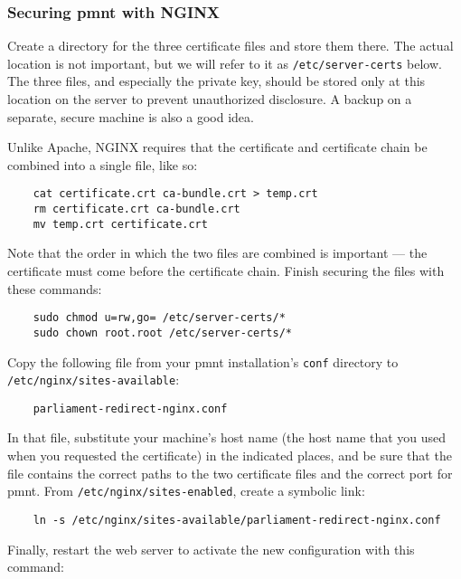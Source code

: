 \subsubsection{Securing \ac{pmnt} with NGINX}
\label{section-securing-parliament-nginx}

Create a directory for the three certificate files and store them there.  The actual location is not important, but we will refer to it as \texttt{/etc/server-certs} below.  The three files, and especially the private key, should be stored only at this location on the server to prevent unauthorized disclosure.  A backup on a separate, secure machine is also a good idea.

Unlike Apache, NGINX requires that the certificate and certificate chain be combined into a single file, like so:

\begin{Verbatim}
	cat certificate.crt ca-bundle.crt > temp.crt
	rm certificate.crt ca-bundle.crt
	mv temp.crt certificate.crt
\end{Verbatim}

Note that the order in which the two files are combined is important --- the certificate must come before the certificate chain.  Finish securing the files with these commands:

\begin{Verbatim}
	sudo chmod u=rw,go= /etc/server-certs/*
	sudo chown root.root /etc/server-certs/*
\end{Verbatim}

Copy the following file from your \ac{pmnt} installation's \texttt{conf} directory to \texttt{/etc/nginx/sites-available}:

\begin{Verbatim}
	parliament-redirect-nginx.conf
\end{Verbatim}

In that file, substitute your machine's host name (the host name that you used when you requested the certificate) in the indicated places, and be sure that the file contains the correct paths to the two certificate files and the correct port for \ac{pmnt}.  From \texttt{/etc/nginx/sites-enabled}, create a symbolic link:

\begin{Verbatim}
	ln -s /etc/nginx/sites-available/parliament-redirect-nginx.conf
\end{Verbatim}

Finally, restart the web server to activate the new configuration with this command:

